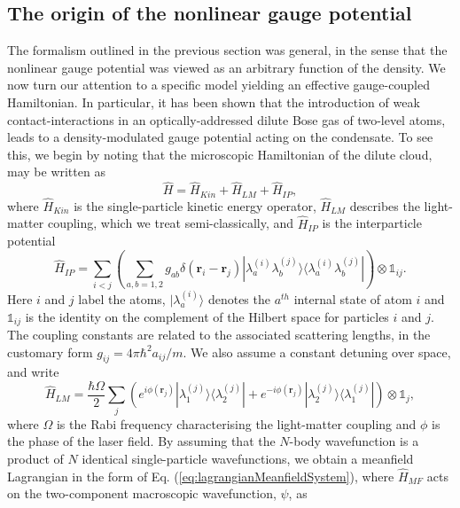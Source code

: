 \documentclass[twocolumn, nofootinbib, nobibnotes, amsmath,amssymb,aps, pra, floatfix]{revtex4-1}
\renewcommand{\v}[1]{\ensuremath{\mathbf{#1}}} %
\begin{document}
\subsection{The origin of the nonlinear gauge potential}
The formalism outlined in the previous section was general, in the sense that the nonlinear gauge potential was viewed as an arbitrary function of the density.
We now turn our attention to a specific model yielding an effective gauge-coupled Hamiltonian.
In particular, it has been shown \cite{edmonds2013} that the introduction of weak contact-interactions in an optically-addressed dilute Bose gas of two-level atoms, leads to a density-modulated gauge potential acting on the condensate.
To see this, we begin by noting that the microscopic Hamiltonian of the dilute cloud, may be written as 
\begin{equation}
\hat{H}=\hat{H}_{Kin}+\hat{H}_{LM}+\hat{H}_{IP},
\end{equation}
where $\hat{H}_{Kin}$ is the single-particle kinetic energy operator, $\hat{H}_{LM}$ describes the light-matter coupling, which we treat semi-classically, and $\hat{H}_{IP}$ is the interparticle potential
\begin{equation}
  \hat{H}_{IP}=\sum_{i<j}\left(\sum_{a,b=1,2}g_{ab}\delta(\v{r}_i-\v{r}_j)|\lambda_a^{(i)}\lambda_b^{(j)}\rangle\langle \lambda_a^{(i)}\lambda_b^{(j)}|\right)\otimes\mathbb{1}_{ij}.
\end{equation}
Here $i$ and $j$ label the atoms, $|\lambda_a^{(i)}\rangle$ denotes the $a^{th}$ internal state of atom $i$ and $\mathbb{1}_{ij}$ is the identity on the complement of the Hilbert space for particles $i$ and $j$.
The coupling constants are related to the associated scattering lengths, in the customary form $g_{ij}=4\pi\hbar^2 a_{ij}/m$.
We also assume a constant detuning over space, and write
\begin{equation}
    \hat{H}_{LM}=\frac{\hbar\Omega}{2}\sum_j\left(e^{i\phi(\v{r}_j)}|\lambda_1^{(j)}\rangle\langle\lambda_2^{(j)}|+e^{-i\phi(\v{r}_j)}|\lambda_2^{(j)}\rangle\langle\lambda_1^{(j)}|\right)\otimes\mathbb{1}_j,
\end{equation}
where $\Omega$ is the Rabi frequency characterising the light-matter coupling and $\phi$ is the phase of the laser field. 
By assuming that the $N$-body wavefunction is a product of $N$ identical single-particle wavefunctions, we obtain \cite{Butera_2016} a meanfield Lagrangian in the form of Eq. (\ref{eq:lagrangianMeanfieldSystem}), where $\hat{H}_{MF}$ acts on the two-component macroscopic wavefunction, $\psi$, as
\end{document}
